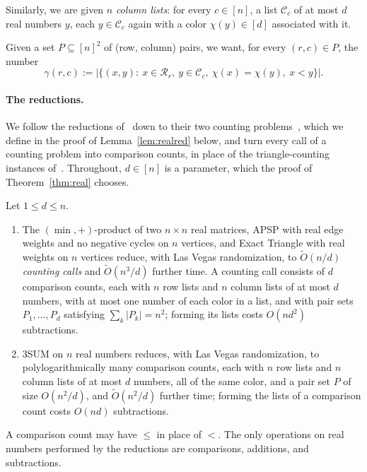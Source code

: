 Similarly, we are given $n$ \emph{column lists}: for every $c\in[n]$, a list $\mathcal C_c$ of at most $d$ real numbers $y$, each $y\in\mathcal C_c$ again with a color $\chi(y)\in[d]$ associated with it.

Given a set $P\subseteq[n]^2$ of (row, column) pairs, we want, for every $(r,c)\in P$, the number
\[
\gamma(r,c):=\big|\{(x,y):\ x\in\mathcal R_r,\ y\in\mathcal C_c,\ \chi(x)=\chi(y),\ x<y\}\big| .
\]

\paragraph{The reductions.}
We follow the reductions of~\cite{CVX22} down to their two counting problems~\cite[Problems~4.1 and~4.5]{CVX22}, which we define in the proof of Lemma~\ref{lem:realred} below, and turn every call of a counting problem into comparison counts, in place of the triangle-counting instances of~\cite[Lemmas~4.3 and~4.7]{CVX22}. Throughout, $d\in[n]$ is a parameter, which the proof of Theorem~\ref{thm:real} chooses.

\begin{lemma}\label{lem:realred}
Let $1\le d\le n$.
\begin{enumerate}
\item[(a)] The $(\min,+)$-product of two $n\times n$ real matrices, APSP with real edge weights and no negative cycles on $n$ vertices, and Exact Triangle with real weights on $n$ vertices reduce, with Las Vegas randomization, to $\tilde{O}(n/d)$ \emph{counting calls} and $\tilde{O}(n^3/d)$ further time. A counting call consists of $d$ comparison counts, each with $n$ row lists and $n$ column lists of at most $d$ numbers, with at most one number of each color in a list, and with pair sets $P_1,\dots,P_d$ satisfying $\sum_k|P_k|=n^2$; forming its lists costs $O(nd^2)$ subtractions.
\item[(b)] $3$SUM on $n$ real numbers reduces, with Las Vegas randomization, to polylogarithmically many comparison counts, each with $n$ row lists and $n$ column lists of at most $d$ numbers, all of the same color, and a pair set $P$ of size $O(n^2/d)$, and $\tilde{O}(n^2/d)$ further time; forming the lists of a comparison count costs $O(nd)$ subtractions.
\end{enumerate}
A comparison count may have $\le$ in place of $<$. The only operations on real numbers performed by the reductions are comparisons, additions, and subtractions.
\end{lemma}

